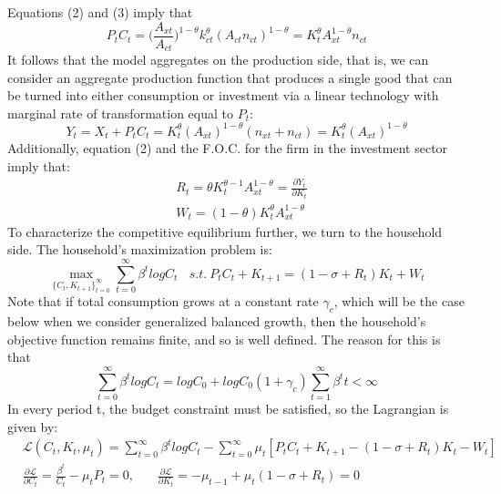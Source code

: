 \documentclass{article}
\begin{document}
    Equations (2) and (3) imply that
    \begin{equation*}
        P_tC_t=\biggl( \frac{A_{xt}}{A_{ct}} \biggr)^{1-\theta} k_{ct}^\theta (A_{ct} n_{ct})^{1-\theta}=K_t^\theta A_{xt}^{1-\theta} n_{ct}
    \end{equation*}
    It follows that the model aggregates on the production side, that is, we can consider an aggregate production function that produces a single good that can be turned into either consumption or investment via a linear technology with marginal rate of transformation equal to $P_t$:
    \begin{equation}
        Y_t=X_t+P_tC_t=K_t^\theta (A_{xt})^{1-\theta} (n_{xt}+n_{ct})=K_t^\theta (A_{xt})^{1-\theta}
    \end{equation}
    Additionally, equation (2) and the F.O.C. for the firm in the investment sector imply that:
    \begin{align}
        &R_t = \theta K_t^{\theta-1} A_{xt}^{1-\theta} = \frac
        {\partial Y_t}{\partial K_t} \\
        &W_t = (1-\theta) K_t^\theta A_{xt}^{1-\theta}
    \end{align}
    To characterize the competitive equilibrium further, we turn to the household side. The household’s maximization problem is:
    \begin{equation*}
        \max_{\{ C_t,K_{t+1} \}_{t=0}^{\infty}} \sum_{t=0}^{\infty} \beta^t log C_t \ \ \ \ s.t.\ P_tC_t+K_{t+1}=(1-\sigma+R_t)K_t+W_t
    \end{equation*}
    Note that if total consumption grows at a constant rate $\gamma_c$, which will be the case below when we consider generalized balanced growth, then the household’s objective function remains finite, and so is well defined. The reason for this is that
    \begin{equation*}
        \sum_{t=0}^{\infty} \beta^t log C_t = log C_0+logC_0(1+\gamma_c)\sum_{t=1}^{\infty} \beta^t t < \infty 
    \end{equation*}
    In every period t, the budget constraint must be satisfied, so the Lagrangian is given by:
    \begin{align*}
        &\mathcal{L}(C_t,K_{t},\mu_t)=\sum_{t=0}^{\infty} \beta^t log C_t- \sum_{t=0}^\infty \mu_t [P_tC_t+K_{t+1}-(1-\sigma+R_t)K_t-W_t]\\
        &\frac{\partial \mathcal{L}}{\partial C_t}=\frac{\beta^t}{C_t}-\mu_t P_t=0,\ \ \ \ \ \ \ \ \frac{\partial \mathcal{L}}{\partial K_t}=-\mu_{t-1}+\mu_t(1-\sigma+R_t)=0
    \end{align*}
\end{document}
